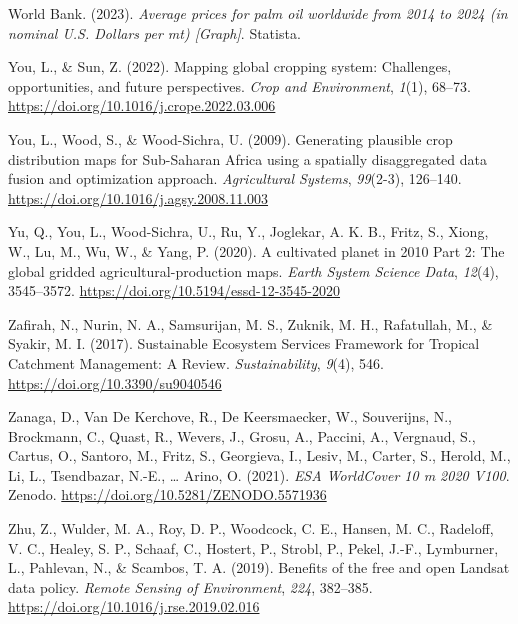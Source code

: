 \documentclass[
  letterpaper,
  DIV=11,
  numbers=noendperiod]{scrreprt}
\newlength{\cslhangindent}
\newlength{\cslentryspacingunit} %
\newenvironment{CSLReferences}[2] %
 {%
  \setlength{\parindent}{0pt}
  \ifodd #1
  \let\oldpar\par
  \def\par{\hangindent=\cslhangindent\oldpar}
  \fi
  \setlength{\parskip}{#2\cslentryspacingunit}
 }%
 {}
\begin{document}
\begin{CSLReferences}{1}{0}
\leavevmode{}%
World Bank. (2023). \emph{Average prices for palm oil worldwide from
2014 to 2024 (in nominal {U}.{S}. Dollars per mt) {[}{Graph}{]}}.
{Statista}.

\leavevmode{}%
You, L., \& Sun, Z. (2022). Mapping global cropping system:
{Challenges}, opportunities, and future perspectives. \emph{Crop and
Environment}, \emph{1}(1), 68--73.
\url{https://doi.org/10.1016/j.crope.2022.03.006}

\leavevmode{}%
You, L., Wood, S., \& Wood-Sichra, U. (2009). Generating plausible crop
distribution maps for {Sub-Saharan Africa} using a spatially
disaggregated data fusion and optimization approach. \emph{Agricultural
Systems}, \emph{99}(2-3), 126--140.
\url{https://doi.org/10.1016/j.agsy.2008.11.003}

\leavevmode{}%
Yu, Q., You, L., Wood-Sichra, U., Ru, Y., Joglekar, A. K. B., Fritz, S.,
Xiong, W., Lu, M., Wu, W., \& Yang, P. (2020). A cultivated planet in
2010 \textendash{} {Part} 2: {The} global gridded
agricultural-production maps. \emph{Earth System Science Data},
\emph{12}(4), 3545--3572.
\url{https://doi.org/10.5194/essd-12-3545-2020}

\leavevmode{}%
Zafirah, N., Nurin, N. A., Samsurijan, M. S., Zuknik, M. H., Rafatullah,
M., \& Syakir, M. I. (2017). Sustainable {Ecosystem Services Framework}
for {Tropical Catchment Management}: {A Review}. \emph{Sustainability},
\emph{9}(4), 546. \url{https://doi.org/10.3390/su9040546}

\leavevmode{}%
Zanaga, D., Van De Kerchove, R., De Keersmaecker, W., Souverijns, N.,
Brockmann, C., Quast, R., Wevers, J., Grosu, A., Paccini, A., Vergnaud,
S., Cartus, O., Santoro, M., Fritz, S., Georgieva, I., Lesiv, M.,
Carter, S., Herold, M., Li, L., Tsendbazar, N.-E., \ldots{} Arino, O.
(2021). \emph{{ESA WorldCover} 10 m 2020 V100}. {Zenodo}.
\url{https://doi.org/10.5281/ZENODO.5571936}

\leavevmode{}%
Zhu, Z., Wulder, M. A., Roy, D. P., Woodcock, C. E., Hansen, M. C.,
Radeloff, V. C., Healey, S. P., Schaaf, C., Hostert, P., Strobl, P.,
Pekel, J.-F., Lymburner, L., Pahlevan, N., \& Scambos, T. A. (2019).
Benefits of the free and open {Landsat} data policy. \emph{Remote
Sensing of Environment}, \emph{224}, 382--385.
\url{https://doi.org/10.1016/j.rse.2019.02.016}

\end{CSLReferences}
\end{document}
